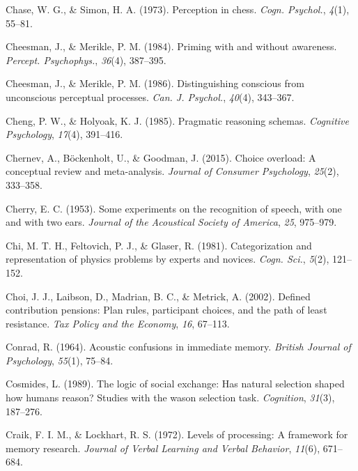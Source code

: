 \documentclass[
]{krantz}
\newlength{\cslhangindent}
\newenvironment{CSLReferences}[2] %
 {\begin{list}{}{%
  \setlength{\itemindent}{0pt}
  \setlength{\leftmargin}{0pt}
  \setlength{\parsep}{0pt}
  \ifodd #1
   \setlength{\leftmargin}{\cslhangindent}
   \setlength{\itemindent}{-1\cslhangindent}
  \fi
  \setlength{\itemsep}{#2\baselineskip}}}
 {\end{list}}
\begin{document}
\begin{CSLReferences}{1}{0}
Chase, W. G., \& Simon, H. A. (1973). Perception in chess. \emph{Cogn. Psychol.}, \emph{4}(1), 55--81.

Cheesman, J., \& Merikle, P. M. (1984). Priming with and without awareness. \emph{Percept. Psychophys.}, \emph{36}(4), 387--395.

Cheesman, J., \& Merikle, P. M. (1986). Distinguishing conscious from unconscious perceptual processes. \emph{Can. J. Psychol.}, \emph{40}(4), 343--367.

Cheng, P. W., \& Holyoak, K. J. (1985). Pragmatic reasoning schemas. \emph{Cognitive Psychology}, \emph{17}(4), 391--416.

Chernev, A., Böckenholt, U., \& Goodman, J. (2015). Choice overload: A conceptual review and meta-analysis. \emph{Journal of Consumer Psychology}, \emph{25}(2), 333--358.

Cherry, E. C. (1953). Some experiments on the recognition of speech, with one and with two ears. \emph{Journal of the Acoustical Society of America}, \emph{25}, 975--979.

Chi, M. T. H., Feltovich, P. J., \& Glaser, R. (1981). Categorization and representation of physics problems by experts and novices. \emph{Cogn. Sci.}, \emph{5}(2), 121--152.

Choi, J. J., Laibson, D., Madrian, B. C., \& Metrick, A. (2002). Defined contribution pensions: Plan rules, participant choices, and the path of least resistance. \emph{Tax Policy and the Economy}, \emph{16}, 67--113.

Conrad, R. (1964). Acoustic confusions in immediate memory. \emph{British Journal of Psychology}, \emph{55}(1), 75--84.

Cosmides, L. (1989). The logic of social exchange: Has natural selection shaped how humans reason? Studies with the wason selection task. \emph{Cognition}, \emph{31}(3), 187--276.

Craik, F. I. M., \& Lockhart, R. S. (1972). Levels of processing: A framework for memory research. \emph{Journal of Verbal Learning and Verbal Behavior}, \emph{11}(6), 671--684.


\end{CSLReferences}
\end{document}

